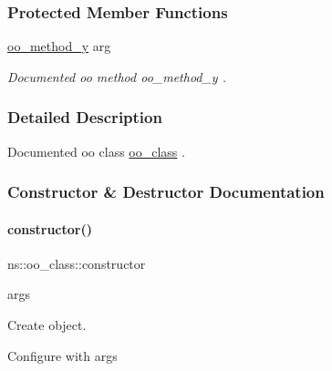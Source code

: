 \subsubsection*{Protected Member Functions}
\begin{DoxyCompactItemize}
\item 
\hyperlink{classns_1_1oo__class_ad07feb192f34010ed66d123338c7acdd}{oo\+\_\+method\+\_\+y} arg
\begin{DoxyCompactList}\small\item\em Documented oo method {\ttfamily oo\+\_\+method\+\_\+y} . \end{DoxyCompactList}\end{DoxyCompactItemize}


\subsubsection{Detailed Description}
Documented oo class {\ttfamily \hyperlink{classns_1_1oo__class}{oo\+\_\+class}} . 

\subsubsection{Constructor \& Destructor Documentation}
\mbox{\label{classns_1_1oo__class_aa26b64151d4b4b0e8b4977aae7048f9b}} 
\paragraph{\texorpdfstring{constructor()}{constructor()}}
{\footnotesize\ttfamily ns\+::oo\+\_\+class\+::constructor\begin{DoxyParamCaption}\item[{}]{args  }\end{DoxyParamCaption}}



Create object. 

Configure with args 
\mbox{\label{classns_1_1oo__class_af148cfc1c090a05986c68ac9452a510a}} 
